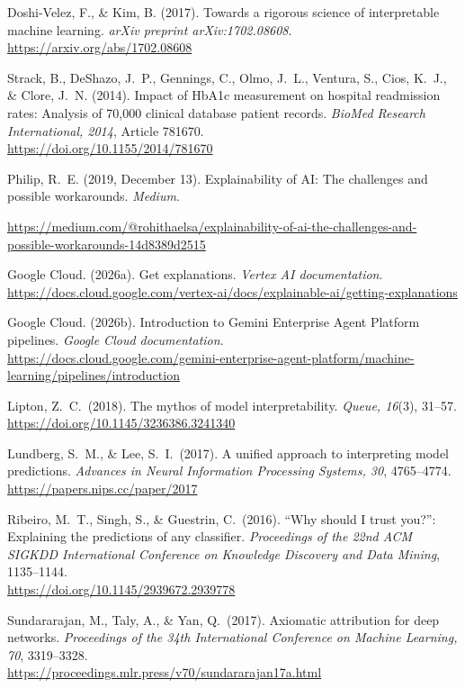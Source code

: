 \documentclass[12pt,letterpaper]{article}
\begin{document}
\noindent
Doshi-Velez, F., \& Kim, B. (2017). Towards a rigorous science of interpretable
machine learning. \textit{arXiv preprint arXiv:1702.08608}.
\\\small\url{https://arxiv.org/abs/1702.08608}\normalsize

\noindent
Strack, B., DeShazo, J.~P., Gennings, C., Olmo, J.~L., Ventura, S., Cios, K.~J.,
\& Clore, J.~N. (2014). Impact of HbA1c measurement on hospital readmission rates:
Analysis of 70{,}000 clinical database patient records.
\textit{BioMed Research International, 2014}, Article 781670.
\\\small\url{https://doi.org/10.1155/2014/781670}\normalsize

\noindent
Philip, R.~E. (2019, December 13). Explainability of AI: The challenges and
possible workarounds. \textit{Medium}.\\\small
{\sloppy\url{https://medium.com/@rohithaelsa/explainability-of-ai-the-challenges-and-possible-workarounds-14d8389d2515}\par}\normalsize

\noindent
Google Cloud. (2026a). Get explanations. \textit{Vertex AI documentation}.
\\\small\url{https://docs.cloud.google.com/vertex-ai/docs/explainable-ai/getting-explanations}\normalsize

\noindent
Google Cloud. (2026b). Introduction to Gemini Enterprise Agent Platform pipelines.
\textit{Google Cloud documentation}.
\\\small\url{https://docs.cloud.google.com/gemini-enterprise-agent-platform/machine-learning/pipelines/introduction}\normalsize

\noindent
Lipton, Z.\ C.\ (2018). The mythos of model interpretability.
\textit{Queue, 16}(3), 31--57.
\\\small\url{https://doi.org/10.1145/3236386.3241340}\normalsize

\noindent
Lundberg, S.\ M., \& Lee, S.\ I.\ (2017). A unified approach to interpreting model
predictions. \textit{Advances in Neural Information Processing Systems, 30},
4765--4774.
\\\small\url{https://papers.nips.cc/paper/2017}\normalsize

\noindent
Ribeiro, M.\ T., Singh, S., \& Guestrin, C.\ (2016). ``Why should I trust you?'':
Explaining the predictions of any classifier. \textit{Proceedings of the 22nd ACM
SIGKDD International Conference on Knowledge Discovery and Data Mining},
1135--1144.
\\\small\url{https://doi.org/10.1145/2939672.2939778}\normalsize

\noindent
Sundararajan, M., Taly, A., \& Yan, Q.\ (2017). Axiomatic attribution for deep
networks. \textit{Proceedings of the 34th International Conference on Machine
Learning, 70}, 3319--3328.
\\\small\url{https://proceedings.mlr.press/v70/sundararajan17a.html}\normalsize

\endgroup
\end{document}
